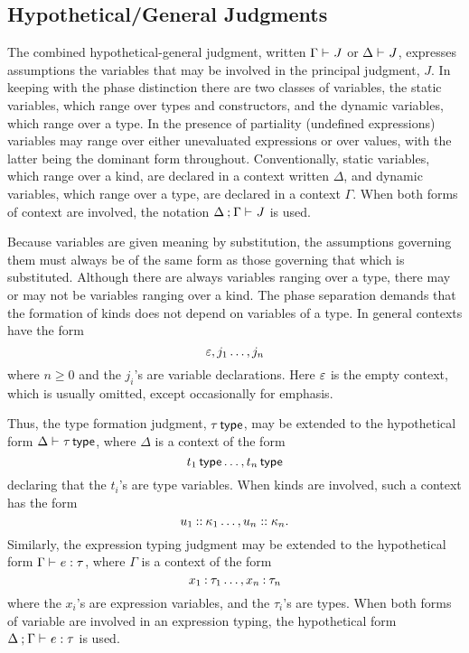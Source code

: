 \documentclass[11pt]{article}
\begin{document}
\subsection*{Hypothetical/General Judgments}

The combined hypothetical-general judgment, written $\Gamma\hypJdg J$ or $\Delta\hypJdg J$, expresses assumptions the variables that may be involved in the principal judgment, $J$.  In keeping with the phase distinction there are two classes of variables, the static variables, which range over types and constructors, and the dynamic variables, which range over a type.  In the presence of partiality (undefined expressions) variables may range over either unevaluated expressions or over values, with the latter being the dominant form throughout.  Conventionally, static variables, which range over a kind, are declared in a context written $\Delta$, and dynamic variables, which range over a type, are declared in a context $\Gamma$.  When both forms of context are involved, the notation $\sepCtx{\Delta}{\Gamma}\hypJdg J$ is used.

Because variables are given meaning by substitution, the assumptions governing them must always be of the same form as those governing that which is substituted.  Although there are always variables ranging over a type, there may or may not be variables ranging over a kind.  The phase separation demands that the formation of kinds does not depend on variables of a type.  In general contexts have the form
\[
    \varepsilon,j_1\dots,j_n
\]
where $n\geq 0$ and the $j_i$'s are variable declarations.  Here $\varepsilon$ is the empty context, which is usually omitted, except occasionally for emphasis.

Thus, the type formation judgment, $\tau\,\textsf{type}$, may be extended to the hypothetical form $\Delta\hypJdg\isTp{\tau}$, where $\Delta$ is a context of the form
\[
    t_1\,\textsf{type}\dots,t_n\,\textsf{type}
\]
declaring that the $t_i$'s are type variables.  When kinds are involved, such a context has the form
\[
    \extCtx{\isOfKd*{u_1}{\kappa_1}\dots}{\isOfKd{u_n}{\kappa_n}}.
\]
Similarly, the expression typing judgment may be extended to the hypothetical form $\Gamma\hypJdg \isOf{e}{\tau}$, where $\Gamma$ is a context of the form
\[
    \extCtx{\isOf*{x_1}{\tau_1}\dots}{\isOf*{x_n}{\tau_n}}
\]
where the $x_i$'s are expression variables, and the $\tau_i$'s are types.  When both forms of variable are involved in an expression typing, the hypothetical form $\sepCtx{\Delta}{\Gamma}\hypJdg \isOf{e}{\tau}$ is used.
\end{document}
